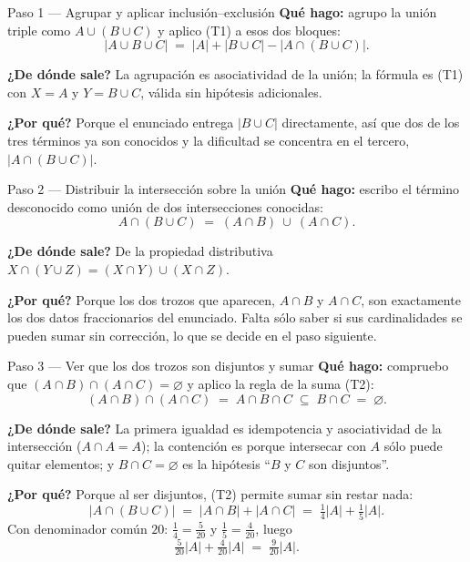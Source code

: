 \documentclass[11pt]{article}
\begin{document}
\begin{sol}

\begin{paso}{Paso 1 --- Agrupar y aplicar inclusión--exclusión}
\textbf{Qué hago:} agrupo la unión triple como $A\cup (B\cup C)$ y aplico (T1) a esos dos bloques:
\[
|A\cup B\cup C| \;=\; |A| + |B\cup C| - |A\cap (B\cup C)| .
\]

\textbf{¿De dónde sale?} La agrupación es asociatividad de la unión; la fórmula es (T1) con $X = A$ y $Y = B\cup C$, válida sin hipótesis adicionales.

\textbf{¿Por qué?} Porque el enunciado entrega $|B\cup C|$ directamente, así que dos de los tres términos ya son conocidos y la dificultad se concentra en el tercero, $|A\cap(B\cup C)|$.
\end{paso}

\begin{paso}{Paso 2 --- Distribuir la intersección sobre la unión}
\textbf{Qué hago:} escribo el término desconocido como unión de dos intersecciones conocidas:
\[
A\cap (B\cup C) \;=\; (A\cap B)\ \cup\ (A\cap C).
\]

\textbf{¿De dónde sale?} De la propiedad distributiva $X\cap(Y\cup Z) = (X\cap Y)\cup(X\cap Z)$.

\textbf{¿Por qué?} Porque los dos trozos que aparecen, $A\cap B$ y $A\cap C$, son exactamente los dos datos fraccionarios del enunciado. Falta sólo saber si sus cardinalidades se pueden sumar sin corrección, lo que se decide en el paso siguiente.
\end{paso}

\begin{paso}{Paso 3 --- Ver que los dos trozos son disjuntos y sumar}
\textbf{Qué hago:} compruebo que $(A\cap B)\cap (A\cap C) = \varnothing$ y aplico la regla de la suma (T2):
\[
(A\cap B)\cap(A\cap C) \;=\; A\cap B\cap C \;\subseteq\; B\cap C \;=\; \varnothing .
\]

\textbf{¿De dónde sale?} La primera igualdad es idempotencia y asociatividad de la intersección ($A\cap A = A$); la contención es porque intersecar con $A$ sólo puede quitar elementos; y $B\cap C=\varnothing$ es la hipótesis ``$B$ y $C$ son disjuntos''.

\textbf{¿Por qué?} Porque al ser disjuntos, (T2) permite sumar sin restar nada:
\[
|A\cap (B\cup C)| \;=\; |A\cap B| + |A\cap C| \;=\; \tfrac{1}{4}|A| + \tfrac{1}{5}|A| .
\]
Con denominador común $20$: $\tfrac14 = \tfrac{5}{20}$ y $\tfrac15 = \tfrac{4}{20}$, luego
\[
\tfrac{5}{20}|A| + \tfrac{4}{20}|A| \;=\; \tfrac{9}{20}|A| .
\]


\end{paso}
\end{sol}
\end{document}
